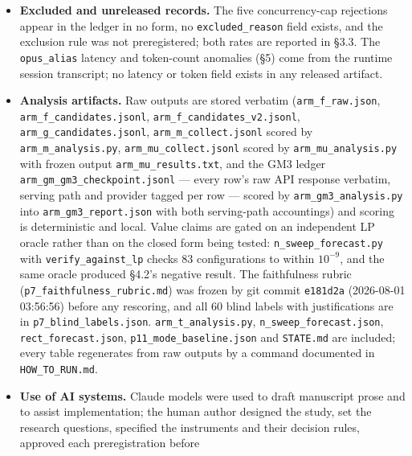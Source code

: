 \begin{itemize}
  corrected field carrying a sibling \texttt{*\_v1} field. \texttt{arm\_f\_candidates.jsonl} is unmodified
  (sha256 \texttt{02ecabcd\ldots}); v2 is \texttt{9f845f78\ldots}. Correction rules, sources, wave-boundary arithmetic
  and caveats --- including that \texttt{run\_date} has day granularity only --- are in
  \textbf{\texttt{ledger\_v2\_corrections.md}}. Analysis scripts read v2.
\item \textbf{Excluded and unreleased records.} The five concurrency-cap rejections appear in the ledger
  in no form, no \texttt{excluded\_reason} field exists, and the exclusion rule was not preregistered;
  both rates are reported in \S3.3. The \texttt{opus\_alias} latency and token-count anomalies (\S5) come
  from the runtime session transcript; no latency or token field exists in any released artifact.
\item \textbf{Analysis artifacts.} Raw outputs are stored verbatim (\texttt{arm\_f\_raw.json},
  \texttt{arm\_f\_candidates.jsonl}, \texttt{arm\_f\_candidates\_v2.jsonl}, \texttt{arm\_g\_candidates.jsonl},
  \texttt{arm\_m\_collect.jsonl} scored by \texttt{arm\_m\_analysis.py}, \texttt{arm\_mu\_collect.jsonl} scored by
  \texttt{arm\_mu\_analysis.py} with frozen output \texttt{arm\_mu\_results.txt}, and the GM3 ledger
  \texttt{arm\_gm\_gm3\_checkpoint.jsonl} --- every row's raw API response verbatim, serving path and
  provider tagged per row --- scored by \texttt{arm\_gm3\_analysis.py} into \texttt{arm\_gm3\_report.json}
  with both serving-path accountings) and scoring is deterministic and local. Value claims are gated on an independent LP oracle rather than on the
  closed form being tested: \texttt{n\_sweep\_forecast.py} with \texttt{verify\_against\_lp} checks 83
  configurations to within $10^{-9}$, and the same oracle produced \S4.2's negative result. The
  faithfulness rubric (\texttt{p7\_faithfulness\_rubric.md}) was frozen by git commit \texttt{e181d2a}
  (2026-08-01 03:56:56) before any rescoring, and all 60 blind labels with justifications are in
  \texttt{p7\_blind\_labels.json}. \texttt{arm\_t\_analysis.py}, \texttt{n\_sweep\_forecast.json}, \texttt{rect\_forecast.json},
  \texttt{p11\_mode\_baseline.json} and \texttt{STATE.md} are included; every table regenerates from raw outputs
  by a command documented in \texttt{HOW\_TO\_RUN.md}.
\item \textbf{Use of AI systems.} Claude models were used to draft manuscript prose and to
  assist implementation; the human author designed the study, set the research questions,
  specified the instruments and their decision rules, approved each preregistration before

\end{itemize}

